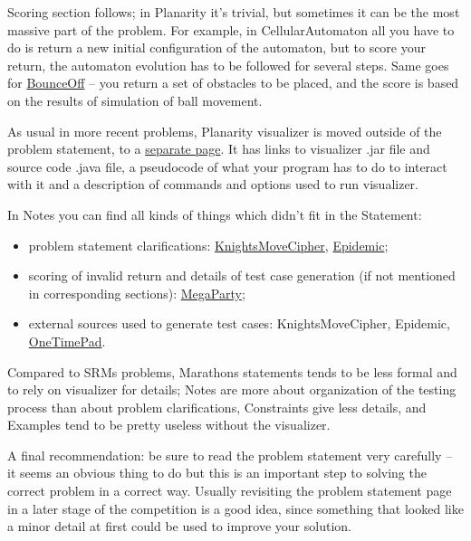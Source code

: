 Scoring section follows; in Planarity it's trivial, but sometimes it can
be the most massive part of the problem. For example, in
CellularAutomaton all you have to do is return a new initial
configuration of the automaton, but to score your return, the automaton
evolution has to be followed for several steps. Same goes for
\href{http://community.topcoder.com/longcontest/?module=ViewProblemStatement\&rd=13791\&pm=10372}{BounceOff}
-- you return a set of obstacles to be placed, and the score is based on
the results of simulation of ball movement.

As usual in more recent problems, Planarity visualizer is moved outside
of the problem statement, to a
\href{https://www.topcoder.com/contest/problem/Planarity/manual.html}{separate
page}. It has links to visualizer .jar file and source code .java file,
a pseudocode of what your program has to do to interact with it and a
description of commands and options used to run visualizer.

In Notes you can find all kinds of things which didn't fit in the
Statement:

\begin{itemize}
\item
  problem statement clarifications:
  \href{http://community.topcoder.com/longcontest/?module=ViewProblemStatement\&rd=13679\&pm=10242}{KnightsMoveCipher},
  \href{http://community.topcoder.com/longcontest/?module=ViewProblemStatement\&rd=11131\&pm=8632}{Epidemic};
\item
  scoring of invalid return and details of test case generation (if not
  mentioned in corresponding sections):
  \href{http://community.topcoder.com/longcontest/?module=ViewProblemStatement\&rd=13709\&pm=10032}{MegaParty};
\item
  external sources used to generate test cases: KnightsMoveCipher,
  Epidemic,
  \href{http://community.topcoder.com/longcontest/?module=ViewProblemStatement\&rd=13564\&pm=9906}{OneTimePad}.
\end{itemize}

Compared to SRMs problems, Marathons statements tends to be less formal
and to rely on visualizer for details; Notes are more about organization
of the testing process than about problem clarifications, Constraints
give less details, and Examples tend to be pretty useless without the
visualizer.

A final recommendation: be sure to read the problem statement very
carefully -- it seems an obvious thing to do but this is an important
step to solving the correct problem in a correct way. Usually revisiting
the problem statement page in a later stage of the competition is a good
idea, since something that looked like a minor detail at first could be
used to improve your solution.

